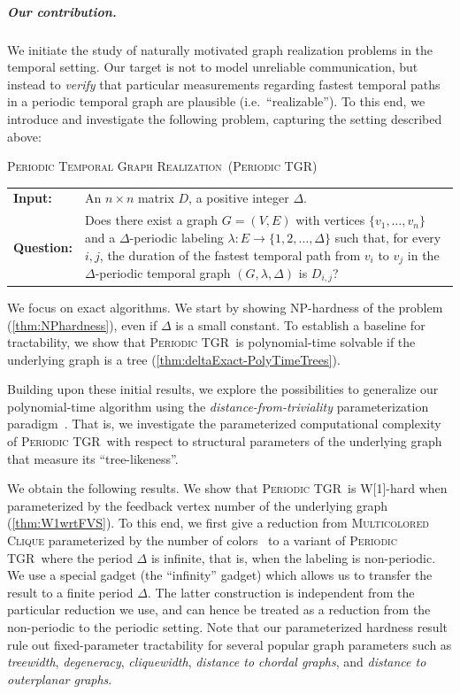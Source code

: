\documentclass[a4paper,UKenglish,cleveref, autoref, thm-restate, anonymous]{lipics-v2021}
\makeatletter
\newcommand{\problemdef}[3]{
	\begin{center}
		\begin{minipage}{0.95\textwidth}
			\noindent
			#1
			\vspace{5pt}\\
			\setlength{\tabcolsep}{3pt}
			\begin{tabularx}{\textwidth}{@{}lX@{}}
				\textbf{Input:}& #2 \\
				\textbf{Question:}& #3
			\end{tabularx}
		\end{minipage}
	\end{center}
}
\newcommand{\deltaExactLong}{\textsc{Periodic Temporal Graph Realization}}
\newcommand{\deltaExact}{\textsc{Periodic TGR}}
\makeatother
\begin{document}
\subparagraph{Our contribution.}
We initiate the study of naturally motivated graph realization problems in the temporal setting. 
Our target is not to model unreliable communication, but instead to \emph{verify} that particular measurements regarding fastest temporal paths in a periodic temporal graph are plausible (i.e.~``realizable''). 
To this end, we introduce and investigate the following problem, capturing the setting described above:
	
	
\problemdef{\deltaExactLong\ (\deltaExact)}
{An $n \times n$ matrix $D$, a positive integer $\Delta$.}
{Does there exist a graph $G=(V,E)$ with vertices $\{v_1,\ldots,v_{n}\}$ 
and a $\Delta$-periodic labeling $\lambda: E \rightarrow \{1,2,\ldots,\Delta\}$ such that, 
for every $i,j$, the duration of the fastest temporal path from $v_i$ to $v_j$ in the $\Delta$-periodic temporal graph $(G,\lambda,\Delta)$ is $D_{i,j}$?}




We focus on exact algorithms. We start by showing NP-hardness of the problem (\cref{thm:NPhardness}), even if $\Delta$ is a small constant. To establish a baseline for tractability, we show that \deltaExact\ is polynomial-time solvable if the underlying graph is a tree (\cref{thm:deltaExact-PolyTimeTrees}).

Building upon these initial results, we explore the possibilities to generalize our polynomial-time algorithm using the \emph{distance-from-triviality} parameterization paradigm~\cite{FJR13,GHN04}. That is, we investigate the parameterized computational complexity of \deltaExact\ with respect to structural parameters of the underlying graph that measure its ``tree-likeness''.

We obtain the following results. We show that \deltaExact\ is W[1]-hard when parameterized by the feedback vertex number of the underlying graph (\cref{thm:W1wrtFVS}). 
To this end, we first give a reduction from \textsc{Multicolored Clique} parameterized by the number of colors~\cite{fellows2009multipleinterval} to a variant of \deltaExact\ where the period $\Delta$ is infinite, that is, when the labeling is non-periodic. We use a special gadget (the ``infinity'' gadget) which allows us to transfer the result to a finite period $\Delta$. The latter construction is independent from the particular reduction we use, and can hence be treated as a reduction from the non-periodic to the periodic setting.
Note that our parameterized hardness result rule out fixed-parameter tractability for several popular graph parameters such as \emph{treewidth}, \emph{degeneracy}, \emph{cliquewidth}, 
\emph{distance to chordal graphs}, and \emph{distance to outerplanar graphs}.
\end{document}
